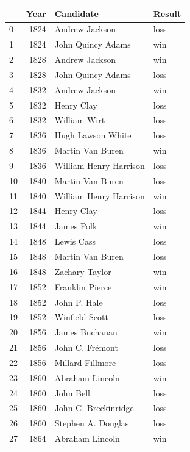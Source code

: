\documentclass[
  letterpaper,
  DIV=11,
  numbers=noendperiod]{scrreprt}
\begin{document}
\begin{tabular}{lrll}
\toprule
{} &  Year &               Candidate & Result \\
\midrule
0   &  1824 &          Andrew Jackson &   loss \\
1   &  1824 &       John Quincy Adams &    win \\
2   &  1828 &          Andrew Jackson &    win \\
3   &  1828 &       John Quincy Adams &   loss \\
4   &  1832 &          Andrew Jackson &    win \\
5   &  1832 &              Henry Clay &   loss \\
6   &  1832 &            William Wirt &   loss \\
7   &  1836 &       Hugh Lawson White &   loss \\
8   &  1836 &        Martin Van Buren &    win \\
9   &  1836 &  William Henry Harrison &   loss \\
10  &  1840 &        Martin Van Buren &   loss \\
11  &  1840 &  William Henry Harrison &    win \\
12  &  1844 &              Henry Clay &   loss \\
13  &  1844 &              James Polk &    win \\
14  &  1848 &              Lewis Cass &   loss \\
15  &  1848 &        Martin Van Buren &   loss \\
16  &  1848 &          Zachary Taylor &    win \\
17  &  1852 &         Franklin Pierce &    win \\
18  &  1852 &            John P. Hale &   loss \\
19  &  1852 &          Winfield Scott &   loss \\
20  &  1856 &          James Buchanan &    win \\
21  &  1856 &         John C. Frémont &   loss \\
22  &  1856 &        Millard Fillmore &   loss \\
23  &  1860 &         Abraham Lincoln &    win \\
24  &  1860 &               John Bell &   loss \\
25  &  1860 &    John C. Breckinridge &   loss \\
26  &  1860 &      Stephen A. Douglas &   loss \\
27  &  1864 &         Abraham Lincoln &    win \\

\end{tabular}
\end{document}
